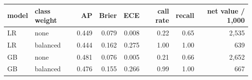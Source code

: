 \begin{tabular}{llrrrrrr}
\toprule
model & class weight & AP & Brier & ECE & call rate & recall & net value / 1,000 \\
\midrule
LR & none & 0.449 & 0.079 & 0.008 & 0.22 & 0.65 & 2,535 \\
LR & balanced & 0.444 & 0.162 & 0.275 & 1.00 & 1.00 & 639 \\
GB & none & 0.481 & 0.076 & 0.005 & 0.21 & 0.66 & 2,652 \\
GB & balanced & 0.476 & 0.155 & 0.266 & 0.99 & 1.00 & 667 \\
\bottomrule
\end{tabular}